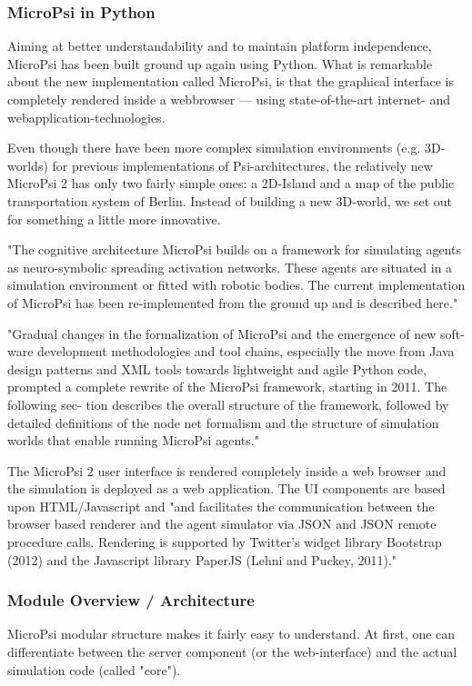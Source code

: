             \subsubsection{MicroPsi in Python}
Aiming at better understandability and to maintain platform independence, MicroPsi has been built ground up again using Python. What is remarkable about the new implementation called MicroPsi, is that the graphical interface is completely rendered inside a webbrowser --- using state-of-the-art internet- and webapplication-technologies.~\cite{conf/agi/Bach12}
        
Even though there have been more complex simulation environments (e.g. 3D-worlds) for previous implementations of Psi-architectures, the relatively new MicroPsi 2 has only two fairly simple ones: a 2D-Island and a map of the public transportation system of Berlin. Instead of building a new 3D-world, we set out for something a little more innovative.

"The cognitive architecture MicroPsi builds on a framework for simulating agents as neuro-symbolic spreading activation networks. These agents are situated in a simulation environment or fitted with robotic bodies. The current implementation of MicroPsi has been re-implemented from the ground up and is described here."~\cite{conf/agi/Bach12}

"Gradual changes in the formalization of MicroPsi and the emergence of new soft- ware development methodologies and tool chains, especially the move from Java design patterns and XML tools towards lightweight and agile Python code, prompted a complete rewrite of the MicroPsi framework, starting in 2011. The following sec- tion describes the overall structure of the framework, followed by detailed definitions of the node net formalism and the structure of simulation worlds that enable running MicroPsi agents."~\cite{conf/agi/Bach12}

The MicroPsi 2 user interface is rendered completely inside a web browser and the simulation is deployed as a web application. The UI components are based upon HTML/Javascript and "and facilitates the communication between the browser based renderer and the agent simulator via JSON and JSON remote procedure calls. Rendering is supported by Twitter’s widget library Bootstrap (2012) and the Javascript library PaperJS (Lehni and Puckey, 2011)."~\cite{conf/agi/Bach12}

            \subsubsection{Module Overview / Architecture}
MicroPsi modular structure makes it fairly easy to understand. At first, one can differentiate between the server component (or the web-interface) and the actual simulation code (called "core").

